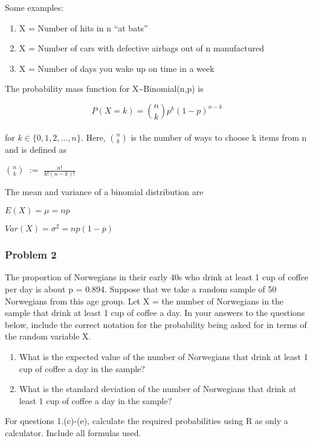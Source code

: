 \documentclass[]{article}
\providecommand{\tightlist}{%
  \setlength{\itemsep}{0pt}\setlength{\parskip}{0pt}}
\begin{document}
Some examples:

\begin{enumerate}
\def\labelenumi{\arabic{enumi}.}
\tightlist
\item
  X = Number of hits in n ``at bats''
\item
  X = Number of cars with defective airbags out of n manufactured
\item
  X = Number of days you wake up on time in a week
\end{enumerate}

The probability mass function for X\textasciitilde Binomial(n,p) is

\[P(X=k) = \binom n k p^k(1-p)^{n-k}\]\\
for \(k\in\{0,1,2,...,n\}\). Here, \(\binom n k\) is the number of ways
to choose k items from n and is defined as

\(\binom n k\) \(:=\) \(\frac{n!}{k!(n-k)!}\)

The mean and variance of a binomial distribution are

\(E(X) = \mu = np\)

\(Var(X) = \sigma^2 = np(1-p)\)

\hypertarget{problem-2}{%
\subsubsection{Problem 2}\label{problem-2}}

The proportion of Norwegians in their early 40s who drink at least 1 cup
of coffee per day is about p = 0.894. Suppose that we take a random
sample of 50 Norwegians from this age group. Let X = the number of
Norwegians in the sample that drink at least 1 cup of coffee a day. In
your answers to the questions below, include the correct notation for
the probability being asked for in terms of the random variable X.

\begin{enumerate}
\def\labelenumi{\alph{enumi})}
\item
  What is the expected value of the number of Norwegians that drink at
  least 1 cup of coffee a day in the sample?
\item
  What is the standard deviation of the number of Norwegians that drink
  at least 1 cup of coffee a day in the sample?
\end{enumerate}

For questions 1.(c)-(e), calculate the required probabilities using R as
only a calculator. Include all formulas used.
\end{document}
